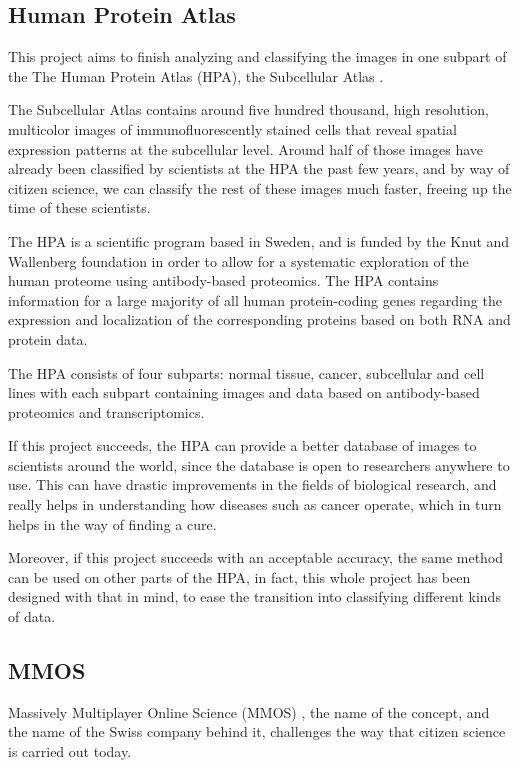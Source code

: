 \subsection{Human Protein Atlas}

	This project aims to finish analyzing and classifying the images in one subpart of the The Human Protein Atlas (HPA), the Subcellular Atlas \cite{subcellatlas}.

	The Subcellular Atlas contains around five hundred thousand, high resolution, multicolor images of immunofluorescently stained cells that reveal spatial expression patterns at the subcellular level. Around half of those images have already been classified by scientists at the HPA the past few years, and by way of citizen science, we can classify the rest of these images much faster, freeing up the time of these scientists.

	The HPA is a scientific program based in Sweden, and is funded by the Knut and Wallenberg foundation in order to allow for a systematic exploration of the human proteome using antibody-based proteomics. The HPA contains information for a large majority of all human protein-coding genes regarding the expression and localization of the corresponding proteins based on both RNA and protein data.

	The HPA consists of four subparts: normal tissue, cancer, subcellular and cell lines with each subpart containing images and data based on antibody-based proteomics and transcriptomics.

	If this project succeeds, the HPA can provide a better database of images to scientists around the world, since the database is open to researchers anywhere to use. This can have drastic improvements in the fields of biological research, and really helps in understanding how diseases such as cancer operate, which in turn helps in the way of finding a cure. 

	Moreover, if this project succeeds with an acceptable accuracy, the same method can be used on other parts of the HPA, in fact, this whole project has been designed with that in mind, to ease the transition into classifying different kinds of data.

\subsection{MMOS}

	Massively Multiplayer Online Science (MMOS) \cite{mmos}, the name of the concept, and the name of the Swiss company behind it, challenges the way that citizen science is carried out today. 

